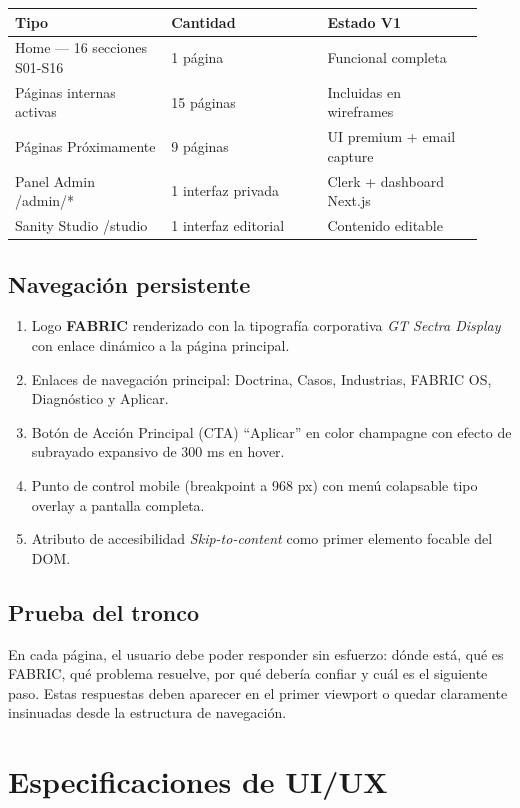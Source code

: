 \documentclass[11pt,letterpaper]{article}
\begin{document}
\begin{longtable}{p{0.31\linewidth}p{0.31\linewidth}p{0.31\linewidth}}
\toprule
\textbf{Tipo} & \textbf{Cantidad} & \textbf{Estado V1} \\
\midrule
Home — 16 secciones S01-S16 & 1 página & Funcional completa \\
Páginas internas activas & 15 páginas & Incluidas en wireframes \\
Páginas Próximamente & 9 páginas & UI premium + email capture \\
Panel Admin /admin/* & 1 interfaz privada & Clerk + dashboard Next.js \\
Sanity Studio /studio & 1 interfaz editorial & Contenido editable \\
\bottomrule
\end{longtable}

\subsection{Navegación persistente}

\begin{enumerate}
\item Logo \textbf{FABRIC} renderizado con la tipografía corporativa \emph{GT Sectra Display} con enlace dinámico a la página principal.
\item Enlaces de navegación principal: Doctrina, Casos, Industrias, FABRIC OS, Diagnóstico y Aplicar.
\item Botón de Acción Principal (CTA) ``Aplicar'' en color champagne con efecto de subrayado expansivo de 300 ms en hover.
\item Punto de control mobile (breakpoint a 968 px) con menú colapsable tipo overlay a pantalla completa.
\item Atributo de accesibilidad \emph{Skip-to-content} como primer elemento focable del DOM.
\end{enumerate}

\subsection{Prueba del tronco}

En cada página, el usuario debe poder responder sin esfuerzo: dónde está, qué es FABRIC, qué problema resuelve, por qué debería confiar y cuál es el siguiente paso. Estas respuestas deben aparecer en el primer viewport o quedar claramente insinuadas desde la estructura de navegación.

\section{Especificaciones de UI/UX}
\end{document}
